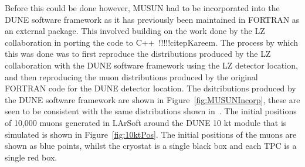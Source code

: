 Before this could be done however, MUSUN had to be incorporated into the DUNE software framework as it has previously been maintained in FORTRAN as an external package. This involved building on the work done by the LZ collaboration in porting the code to C++~!!!!!citep{Kareem}. The process by which this was done was to first reproduce the distributions produced by the LZ collaboration with the DUNE software framework using the LZ detector location, and then reproducing the muon distributions produced by the original FORTRAN code for the DUNE detector location. The dsitributions produced by the DUNE software framework are shown in Figure~\ref{fig:MUSUNIncorp}, these are seen to be consistent with the same distributions shown in~\citep{MUSUNLBNE}. The initial positions of 10,000 muons generated in LArSoft around the DUNE 10 kt module that is simulated is shown in Figure~\ref{fig:10ktPos}. The initial positions of the muons are shown as blue points, whilst the cryostat is a single black box and each TPC is a single red box. \\


